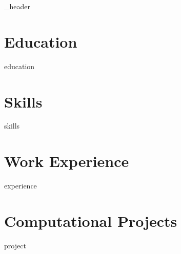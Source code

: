 \documentclass[letter,10pt]{article}
\author{Nicholas Pysklywec}
\begin{document}
{_header}
\vspace*{10pt}

\section{Education}
{education}
\vspace*{10pt}

\section{Skills}
\vspace*{3pt}
{skills}
\vspace*{10pt}
\section{Work Experience}
{experience}
\vspace*{10pt}

\newpage 

\section{Computational Projects}
\vspace*{3pt}
{project}
\vspace*{10pt}
\end{document}
